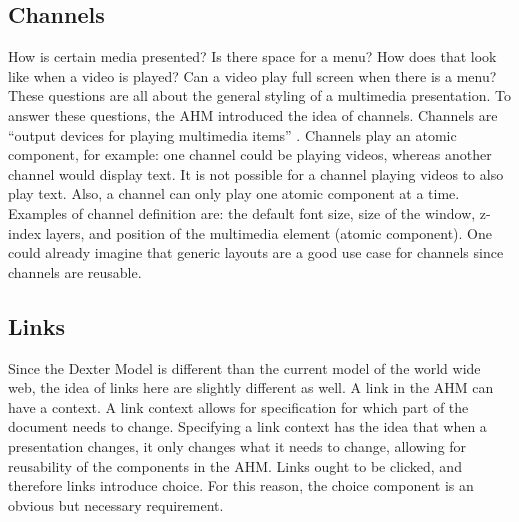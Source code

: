 \subsection{Channels}
How is certain media presented? Is there space for a menu? How does that look like when a video is played? Can a video play full screen when there is a menu? These questions are all about the general styling of a multimedia presentation. To answer these questions, the AHM introduced the idea of channels. Channels are ``output devices for playing multimedia items'' \cite{hardman1994}. Channels play an atomic component, for example: one channel could be playing videos, whereas another channel would display text. It is not possible for a channel playing videos to also play text. Also, a channel can only play one atomic component at a time. Examples of channel definition are: the default font size, size of the window, z-index layers, and position of the multimedia element (atomic component). One could already imagine that generic layouts are a good use case for channels since channels are reusable.


\subsection{Links}
Since the Dexter Model is different than the current model of the world wide web, the idea of links here are slightly different as well. A link in the AHM can have a context. A link context allows for specification for which part of the document needs to change. Specifying a link context has the idea that when a presentation changes, it only changes what it needs to change, allowing for reusability of the components in the AHM. Links ought to be clicked, and therefore links introduce choice. For this reason, the choice component is an obvious but necessary requirement.




